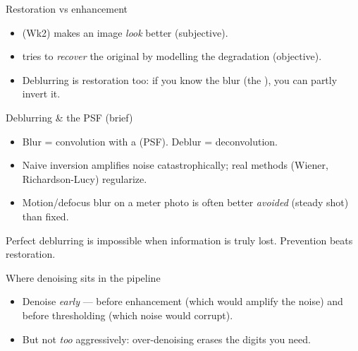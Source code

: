 \documentclass[10pt,aspectratio=169]{beamer}
\begin{document}
\begin{frame}{Restoration vs enhancement}
  \begin{itemize}
    \item {} (Wk2) makes an image \emph{look} better (subjective).
    \item {} tries to \emph{recover} the original by modelling the degradation (objective).
    \item Deblurring is restoration too: if you know the blur (the ), you can partly invert it.
  \end{itemize}
\end{frame}

\begin{frame}{Deblurring \& the PSF (brief)}
  \begin{itemize}
    \item Blur = convolution with a  (PSF). Deblur = deconvolution.
    \item Naive inversion amplifies noise catastrophically; real methods (Wiener, Richardson-Lucy) regularize.
    \item Motion/defocus blur on a meter photo is often better \emph{avoided} (steady shot) than fixed.
  \end{itemize}
  \begin{badbox}
    Perfect deblurring is impossible when information is truly lost. Prevention beats restoration.
  \end{badbox}
\end{frame}

\begin{frame}{Where denoising sits in the pipeline}
  \begin{center}
  \end{center}
  \begin{itemize}
    \item Denoise \emph{early} — before enhancement (which would amplify the noise) and before thresholding (which noise would corrupt).
    \item But not \emph{too} aggressively: over-denoising erases the digits you need.
  \end{itemize}
\end{frame}
\end{document}
